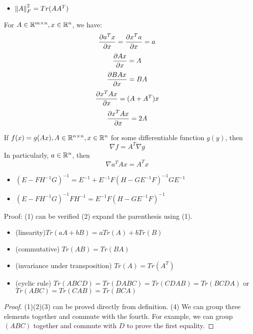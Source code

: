 \begin{refsection}
\begin{itemize}
    \item $\norm{A}_F^2 = Tr(AA^T)$
\end{itemize}

\begin{mdframed}
For $A\in \mathbb{R}^{m\times n},x\in \mathbb{R}^n$, we have:
$$\frac{\partial a^Tx}{\partial x} = \frac{\partial x^Ta}{\partial x} = a$$
$$\frac{\partial Ax}{\partial x} = A $$
$$\frac{\partial BAx}{\partial x} = BA $$
$$\frac{\partial x^TAx}{\partial x} = (A+A^T)x $$
$$\frac{\partial x^TAx}{\partial x} = 2A $$


\end{mdframed}

\begin{lemma}
	If $f(x) = g(Ax), A\in \mathbb{R}^{n\times n},x\in \mathbb{R}^n$ for some differentiable function $g(y)$, then 
	$$\nabla f = A^T \nabla g$$
	In particularly, $a\in \mathbb{R}^n$, then
	$$\nabla a^TAx = A^Tx $$
	
\end{lemma}



\begin{lemma}
\cite[120]{murphy2012machine}
\begin{itemize}
    \item $(E-FH^{-1}G)^{-1} = E^{-1} + E^{-1}F(H-GE^{-1}F)^{-1}GE^{-1}$
    \item $(E-FH^{-1}G)^{-1}FH^{-1} = E^{-1}F(H-GE^{-1}F)^{-1}$
\end{itemize}
\end{lemma}
Proof: (1) can be verified (2) expand the parenthesis using (1).

\begin{lemma}\label{appendix:th:matrixtraceproperty}\hfill
	\begin{itemize}
		\item (linearity)$Tr(aA + bB) = aTr(A) + bTr(B)$
		\item (commutative) $Tr(AB) = Tr(BA)$
		\item (invariance under transposition) $Tr(A) = Tr(A^T)$		
		\item (cyclic rule) $Tr(ABCD) = Tr(DABC)  = Tr(CDAB)= Tr(BCDA) $ or
		$Tr(ABC) = Tr(CAB) = Tr(BCA)$
	\end{itemize}
\end{lemma}
\begin{proof}
(1)(2)(3) can be proved directly from definition. (4) We can group three elements together and commute with the fourth. For example, we can group $(ABC)$ together and commute with $D$ to prove the first equality.
\end{proof}


\end{refsection}
